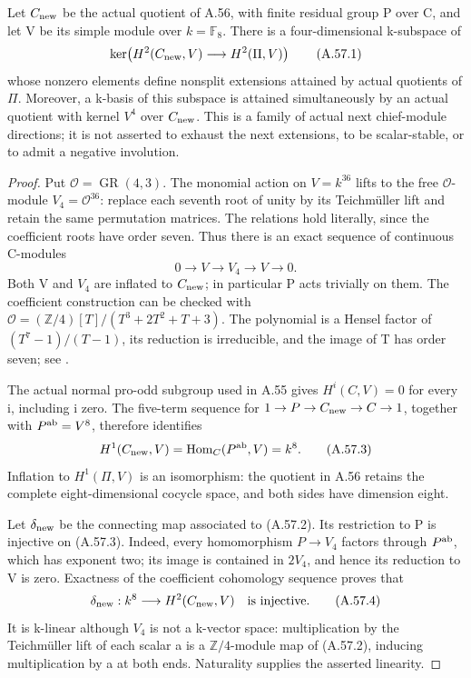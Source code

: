 Let \(C_{\rm new}\) be the actual quotient of A.56, with finite
residual group P over C, and let V be its simple module over
\(k=\mathbb F_8\). There is a four-dimensional k-subspace of
\[
 \ker\!\left(H^2(C_{\rm new},V)\longrightarrow H^2(\Pi,V)\right)
 \tag{A.57.1}
\]
whose nonzero elements define nonsplit extensions attained by
actual quotients of \(\Pi\). Moreover, a k-basis of this subspace
is attained simultaneously by an actual quotient with kernel
\(V^4\) over \(C_{\rm new}\). This is a family of actual next
chief-module directions; it is not asserted to exhaust the next
extensions, to be scalar-stable, or to admit a negative involution.

\begin{proof}
Put \(\mathcal O=\operatorname{GR}(4,3)\). The monomial action on
\(V=k^{36}\) lifts to the free \(\mathcal O\)-module
\(V_4=\mathcal O^{36}\): replace each seventh root of unity by its
Teichm\"uller lift and retain the same permutation matrices. The
relations hold literally, since the coefficient roots have order
seven. Thus there is an exact sequence of continuous C-modules
\[
 0\longrightarrow V\longrightarrow V_4\longrightarrow V
 \longrightarrow0. \tag{A.57.2}
\]
Both V and \(V_4\) are inflated to \(C_{\rm new}\); in particular
P acts trivially on them. The coefficient construction can be
checked with \(\mathcal O=(\mathbb Z/4)[T]/(T^3+2T^2+T+3)\).
The polynomial is a Hensel factor of
\((T^7-1)/(T-1)\), its reduction is irreducible, and the image of
T has order seven; see .

The actual normal pro-odd subgroup used in A.55 gives
\(H^i(C,V)=0\) for every i, including i zero. The five-term
sequence for \(1\to P\to C_{\rm new}\to C\to1\), together with
\(P^{\rm ab}=V^8\), therefore identifies
\[
 H^1(C_{\rm new},V)
   =\operatorname{Hom}_C(P^{\rm ab},V)=k^8.
 \tag{A.57.3}
\]
Inflation to \(H^1(\Pi,V)\) is an isomorphism: the quotient in
A.56 retains the complete eight-dimensional cocycle space, and
both sides have dimension eight.

Let \(\delta_{\rm new}\) be the connecting map associated to
(A.57.2). Its restriction to P is injective on (A.57.3).
Indeed, every homomorphism \(P\to V_4\) factors through
\(P^{\rm ab}\), which has exponent two; its image is contained
in \(2V_4\), and hence its reduction to V is zero. Exactness of
the coefficient cohomology sequence proves that
\[
 \delta_{\rm new}:k^8\longrightarrow H^2(C_{\rm new},V)
 \quad\hbox{is injective}. \tag{A.57.4}
\]
It is k-linear although \(V_4\) is not a k-vector space:
multiplication by the Teichm\"uller lift of each scalar a is a
\(\mathbb Z/4\)-module map of (A.57.2), inducing multiplication
by a at both ends. Naturality supplies the asserted linearity.


\end{proof}
